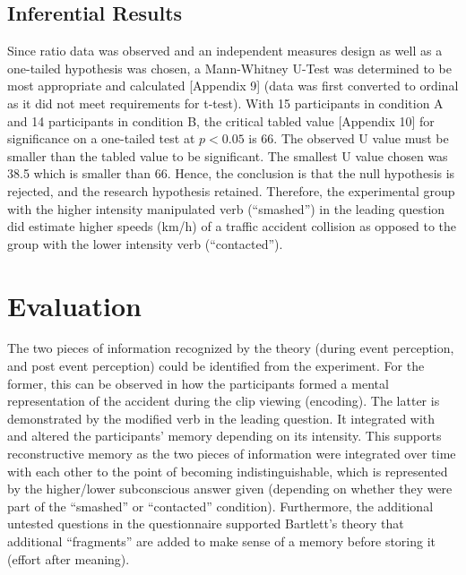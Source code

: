 \documentclass[12pt]{article}
\begin{document}
\subsection{Inferential Results}
Since ratio data was observed and an independent measures design as well as a one-tailed hypothesis was chosen, a Mann-Whitney U-Test was determined to be most appropriate and calculated [Appendix 9] (data was first converted to ordinal as it did not meet requirements for t-test). With 15 participants in condition A and 14 participants in condition B, the critical tabled value [Appendix 10] for significance on a one-tailed test at $p < 0.05$ is 66. The observed U value must be smaller than the tabled value to be significant. The smallest U value chosen was 38.5 which is smaller than 66. Hence, the conclusion is that the null hypothesis is rejected, and the research hypothesis retained. Therefore, the experimental group with the higher intensity manipulated verb (“smashed”) in the leading question did estimate higher speeds (km/h) of a traffic accident collision as opposed to the group with the lower intensity verb (“contacted”). 

\pagebreak
\section{Evaluation}
The two pieces of information recognized by the theory (during event perception, and post event perception) could be identified from the experiment. For the former, this can be observed in how the participants formed a mental representation of the accident during the clip viewing (encoding). The latter is demonstrated by the modified verb in the leading question. It integrated with and altered the participants' memory depending on its intensity. This supports reconstructive memory as the two pieces of information were integrated over time with each other to the point of becoming indistinguishable, which is represented by the higher/lower subconscious answer given (depending on whether they were part of the “smashed” or “contacted” condition). Furthermore, the additional untested questions in the questionnaire supported Bartlett's theory that additional “fragments” are added to make sense of a memory before storing it (effort after meaning). 
\end{document}
